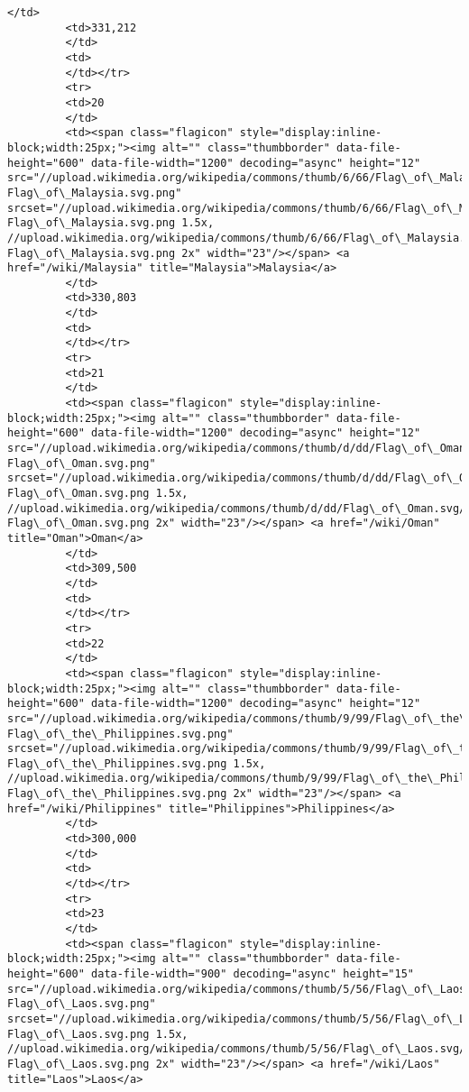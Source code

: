 \documentclass[11pt]{article}
\begin{document}
\begin{Verbatim}[commandchars=\\\{\}]
         </td>
         <td>331,212
         </td>
         <td>
         </td></tr>
         <tr>
         <td>20
         </td>
         <td><span class="flagicon" style="display:inline-block;width:25px;"><img alt="" class="thumbborder" data-file-height="600" data-file-width="1200" decoding="async" height="12" src="//upload.wikimedia.org/wikipedia/commons/thumb/6/66/Flag\_of\_Malaysia.svg/23px-Flag\_of\_Malaysia.svg.png" srcset="//upload.wikimedia.org/wikipedia/commons/thumb/6/66/Flag\_of\_Malaysia.svg/35px-Flag\_of\_Malaysia.svg.png 1.5x, //upload.wikimedia.org/wikipedia/commons/thumb/6/66/Flag\_of\_Malaysia.svg/46px-Flag\_of\_Malaysia.svg.png 2x" width="23"/></span> <a href="/wiki/Malaysia" title="Malaysia">Malaysia</a>
         </td>
         <td>330,803
         </td>
         <td>
         </td></tr>
         <tr>
         <td>21
         </td>
         <td><span class="flagicon" style="display:inline-block;width:25px;"><img alt="" class="thumbborder" data-file-height="600" data-file-width="1200" decoding="async" height="12" src="//upload.wikimedia.org/wikipedia/commons/thumb/d/dd/Flag\_of\_Oman.svg/23px-Flag\_of\_Oman.svg.png" srcset="//upload.wikimedia.org/wikipedia/commons/thumb/d/dd/Flag\_of\_Oman.svg/35px-Flag\_of\_Oman.svg.png 1.5x, //upload.wikimedia.org/wikipedia/commons/thumb/d/dd/Flag\_of\_Oman.svg/46px-Flag\_of\_Oman.svg.png 2x" width="23"/></span> <a href="/wiki/Oman" title="Oman">Oman</a>
         </td>
         <td>309,500
         </td>
         <td>
         </td></tr>
         <tr>
         <td>22
         </td>
         <td><span class="flagicon" style="display:inline-block;width:25px;"><img alt="" class="thumbborder" data-file-height="600" data-file-width="1200" decoding="async" height="12" src="//upload.wikimedia.org/wikipedia/commons/thumb/9/99/Flag\_of\_the\_Philippines.svg/23px-Flag\_of\_the\_Philippines.svg.png" srcset="//upload.wikimedia.org/wikipedia/commons/thumb/9/99/Flag\_of\_the\_Philippines.svg/35px-Flag\_of\_the\_Philippines.svg.png 1.5x, //upload.wikimedia.org/wikipedia/commons/thumb/9/99/Flag\_of\_the\_Philippines.svg/46px-Flag\_of\_the\_Philippines.svg.png 2x" width="23"/></span> <a href="/wiki/Philippines" title="Philippines">Philippines</a>
         </td>
         <td>300,000
         </td>
         <td>
         </td></tr>
         <tr>
         <td>23
         </td>
         <td><span class="flagicon" style="display:inline-block;width:25px;"><img alt="" class="thumbborder" data-file-height="600" data-file-width="900" decoding="async" height="15" src="//upload.wikimedia.org/wikipedia/commons/thumb/5/56/Flag\_of\_Laos.svg/23px-Flag\_of\_Laos.svg.png" srcset="//upload.wikimedia.org/wikipedia/commons/thumb/5/56/Flag\_of\_Laos.svg/35px-Flag\_of\_Laos.svg.png 1.5x, //upload.wikimedia.org/wikipedia/commons/thumb/5/56/Flag\_of\_Laos.svg/45px-Flag\_of\_Laos.svg.png 2x" width="23"/></span> <a href="/wiki/Laos" title="Laos">Laos</a>

\end{Verbatim}
\end{document}
